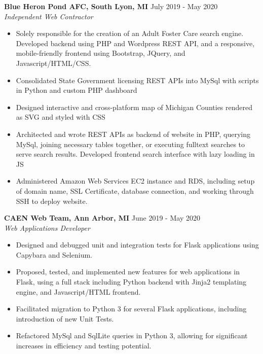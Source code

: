 \documentclass[overlapped]{res}
\begin{document}
\begin{resume}
    \textbf{Blue Heron Pond AFC, South Lyon, MI}
    \hfill July 2019 - May 2020 \\
    {\sl Independent Web Contractor}
    \begin{itemize}  \itemsep -2pt %
        \item Solely responsible for the creation of an Adult Foster Care search engine.
              Developed backend using PHP and Wordpress REST API, and a responsive, mobile-friendly frontend using Bootstrap, JQuery, and Javascript/HTML/CSS.
        \item Consolidated State Government licensing REST APIs into MySql with scripts in Python and custom PHP dashboard
        \item Designed interactive and cross-platform map of Michigan Counties rendered as SVG and styled with CSS
        \item Architected and wrote REST APIs as backend of website in PHP, querying MySql, joining necessary tables together, or executing fulltext searches to serve search results. Developed frontend search interface with lazy loading in JS
        \item Administered Amazon Web Services EC2 instance and RDS, including setup of domain name, SSL Certificate, database connection, and working through SSH to deploy website.
    \end{itemize}
    
    \textbf{CAEN Web Team, Ann Arbor, MI}
    \hfill June 2019 - May 2020 \\
    {\sl Web Applications Developer}
    \begin{itemize}  \itemsep -2pt %
        \item Designed and debugged unit and integration tests for Flask applications using Capybara and Selenium.
        \item Proposed, tested, and implemented new features for web applications in Flask, using a full stack including Python backend with Jinja2 templating engine, and Javascript/HTML frontend.
        \item Facilitated migration to Python 3 for several Flask applications, including introduction of new Unit Tests.
        \item Refactored MySql and SqlLite queries in Python 3, allowing for significant increases in efficiency and testing potential.

    \end{itemize}
    

\end{resume}
\end{document}
